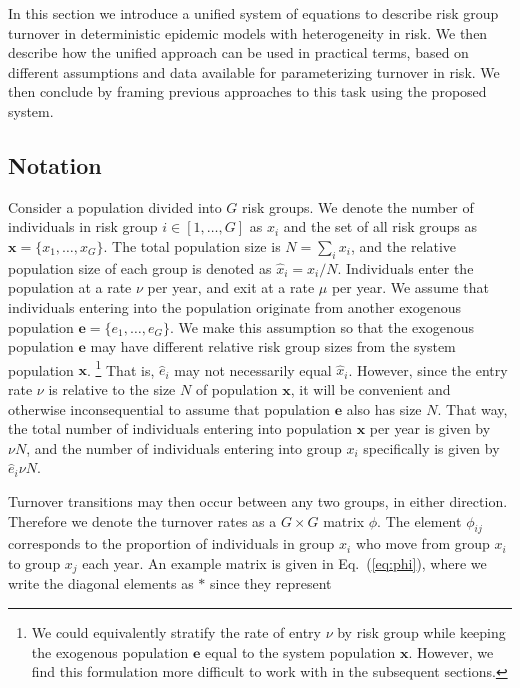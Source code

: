 In this section we introduce a unified system of equations
to describe risk group turnover
in deterministic epidemic models with heterogeneity in risk.
We then describe how the unified approach can be used in practical terms,
based on different assumptions and data available for parameterizing turnover in risk.
We then conclude by framing previous approaches to this task using the proposed system.
\subsection{Notation}
\label{ss:notation}
Consider a population divided into $G$ risk groups.
We denote the number of individuals in risk group $i \in [1, \dots, G]$ as $x_i$
and the set of all risk groups as $\bm{x} = \{x_1, \dots, x_G\}$.
The total population size is $N = \sum_i {x_i}$,
and the relative population size of each group
is denoted as $\hat{x}_i = x_i / N$.
Individuals enter the population at a rate $\nu$ per year,
and exit at a rate $\mu$ per year.
We assume that individuals entering into the population
originate from another exogenous population
$\bm{e} = \{e_1, \dots, e_G\}$.
We make this assumption so that the exogenous population $\bm{e}$
may have different relative risk group sizes from the system population $\bm{x}$.%
\footnote{We could equivalently stratify the rate of entry $\nu$ by risk group
  while keeping the exogenous population $\bm{e}$
  equal to the system population $\bm{x}$.
  However, we find this formulation more difficult to work with
  in the subsequent sections.}
That is, $\hat{e}_i$ may not necessarily equal $\hat{x}_i$.
However, since the entry rate $\nu$ is relative to the size $N$ of population $\bm{x}$,
it will be convenient and otherwise inconsequential to assume that population $\bm{e}$
also has size $N$.
That way, the total number of individuals
entering into population $\bm{x}$ per year is given by $\nu N$,
and the number of individuals
entering into group $x_i$ specifically is given by $\hat{e}_i \nu N$.
\par
Turnover transitions may then occur between any two groups, in either direction.
Therefore we denote the turnover rates as a $G \times G$ matrix $\phi$.
The element $\phi_{ij}$ corresponds to the proportion of individuals in group $x_i$
who move from group $x_i$ to group $x_j$ each year.
An example matrix is given in Eq.~(\ref{eq:phi}),
where we write the diagonal elements as $*$ since they represent
